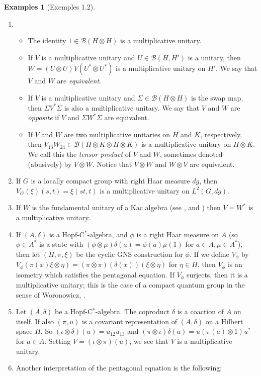 \documentclass[a4paper,12pt]{article}
\theoremstyle{plain}
\theoremstyle{definition}
\newtheorem{examples}[proposition]{Examples}
\newcommand{\mc}{\mathcal}
\begin{document}
\begin{examples}[Exemples 1.2]\label{eg:1}
\begin{enumerate}
\item\begin{itemize}
\item The identity $1\in\mc B(H\otimes H)$ is a multiplicative unitary.
\item\label{eg:1.2} If $V$ is a multiplicative unitary and $U\in\mc B(H,H')$
is a unitary, then $W=(U\otimes U)V(U^*\otimes U^*)$ is a multiplicative
unitary on $H'$.  We say that $V$ and $W$ are \emph{equivalent}.
\item If $V$ is a multiplicative unitary and $\Sigma\in\mc B(H\otimes H)$
is the swap map, then $\Sigma V^* \Sigma$ is also a multiplicative unitary.
We say that $V$ and $W$ are \emph{opposite} if $V$ and $\Sigma W^* \Sigma$
are equivalent.
\item If $V$ and $W$ are two multiplicative unitaries on $H$ and $K$,
respectively, then $V_{13} W_{24} \in \mc B(H\otimes K\otimes H\otimes K)$
is a multiplicative unitary on $H\otimes K$.  We call this the
\emph{tensor product} of $V$ and $W$, sometimes denoted (abusively) by
$V\otimes W$.  Notice that $V\otimes W$ and $W\otimes V$ are equivalent.
\end{itemize}
\item If $G$ is a locally compact group with right Haar measure $dg$, then
$V_G(\xi)(s,t) = \xi(st,t)$ is a multiplicative unitary on $L^2(G,dg)$.
\item If $W$ is the fundamental unitary of a Kac algebra (see \cite{r6},
\cite{r13} and \cite{r17}) then $V=W^*$ is a multiplicative unitary.
\item\label{eg:1.4} If $(A,\delta)$ is a Hopf-C$^*$-algebra, and $\phi$
is a right Haar measure on $A$ (so $\phi\in A^*$ is a state with
$(\phi\otimes\mu)\delta(a) = \phi(a) \mu(1)$ for $a\in A,\mu\in A^*$),
then let $(H,\pi,\xi)$ be the cyclic GNS construction for $\phi$.
If we define $V_\phi$ by $V_\phi(\pi(x)\xi\otimes\eta)
= (\pi\otimes\pi)(\delta(x))(\xi\otimes\eta)$ for $\eta\in H$, then
$V_\phi$ is an isometry which satisfies the pentagonal equation.
If $V_\phi$ surjects, then it is a multiplicative unitary; this is
the case of a compact quantum group in the sense of Woronowicz, \cite{r54}.
\item Let $(A,\delta)$ be a Hopf-C$^*$-algebra.  The coproduct $\delta$ is
a coaction of $A$ on itself.  If also $(\pi,u)$ is a covariant representation
of $(A,\delta)$ on a Hilbert space $H$.  So $(\iota\otimes\delta)(u) = u_{12}
u_{13}$ and $(\pi\otimes\iota)\delta(a) = u(\pi(a)\otimes 1)u^*$ for $a\in A$.
Setting $V=(\iota\otimes\pi)(u)$, we see that $V$ is a multiplicative unitary.
\item Another interpretation of the pentagonal equation is the following:


\end{enumerate}
\end{examples}
\end{document}
